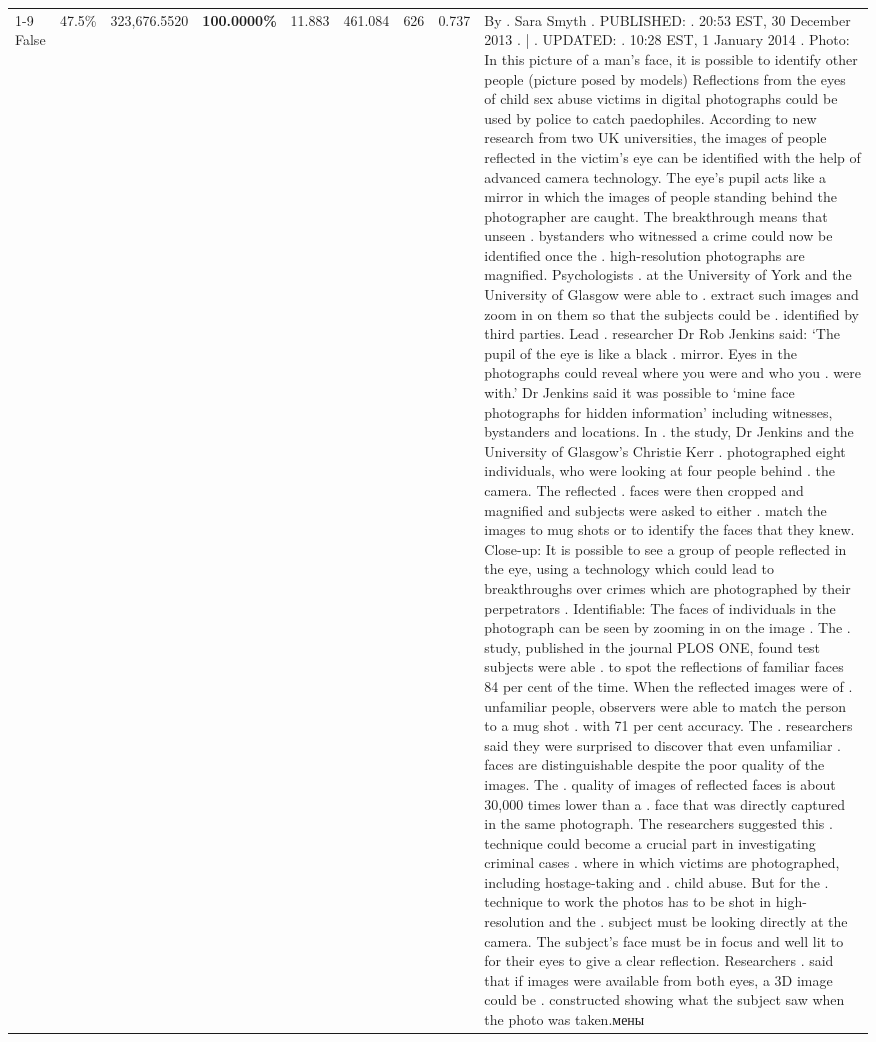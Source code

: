\begin{table}[H]
\begin{tabular}{lllrlllll}
\cline{1-9}
False & 47.5\% & 323,676.5520 & \bfseries \color{red} 100.0000\% & 11.883 & 461.084 & 626 & 0.737 & By . Sara Smyth . PUBLISHED: . 20:53 EST, 30 December 2013 . | . UPDATED: . 10:28 EST, 1 January 2014 . Photo: In this picture of a man's face, it is possible to identify other people (picture posed by models) Reflections from the eyes of child sex abuse victims in digital photographs could be used by police to catch paedophiles. According to new research from two UK universities, the images of people reflected in the victim's eye can be identified with the help of advanced camera technology. The eye's pupil acts like a mirror in which the images of people standing behind the photographer are caught. The breakthrough means that unseen . bystanders who witnessed a crime could now be identified once the . high-resolution photographs are magnified. Psychologists . at the University of York and the University of Glasgow were able to . extract such images and zoom in on them so that the subjects could be . identified by third parties. Lead . researcher Dr Rob Jenkins said: ‘The pupil of the eye is like a black . mirror. Eyes in the photographs could reveal where you were and who you . were with.' Dr Jenkins said it was possible to ‘mine face photographs for hidden information' including witnesses, bystanders and locations. In . the study, Dr Jenkins and the University of Glasgow's Christie Kerr . photographed eight individuals, who were looking at four people behind . the camera. The reflected . faces were then cropped and magnified and subjects were asked to either . match the images to mug shots or to identify the faces that they knew. Close-up: It is possible to see a group of people reflected in the eye, using a technology which could lead to breakthroughs over crimes which are photographed by their perpetrators . Identifiable: The faces of individuals in the photograph can be seen by zooming in on the image . The . study, published in the journal PLOS ONE, found test subjects were able . to spot the reflections of familiar faces 84 per cent of the time. When the reflected images were of . unfamiliar people, observers were able to match the person to a mug shot . with 71 per cent accuracy. The . researchers said they were surprised to discover that even unfamiliar . faces are distinguishable despite the poor quality of the images. The . quality of images of reflected faces is about 30,000 times lower than a . face that was directly captured in the same photograph. The researchers suggested this . technique could become a crucial part in investigating criminal cases . where in which victims are photographed, including hostage-taking and . child abuse. But for the . technique to work the photos has to be shot in high-resolution and the . subject must be looking directly at the camera. The subject's face must be in focus and well lit to for their eyes to give a clear reflection. Researchers . said that if images were available from both eyes, a 3D image could be . constructed showing what the subject saw when the photo was taken.мены \\

\end{tabular}
\end{table}
